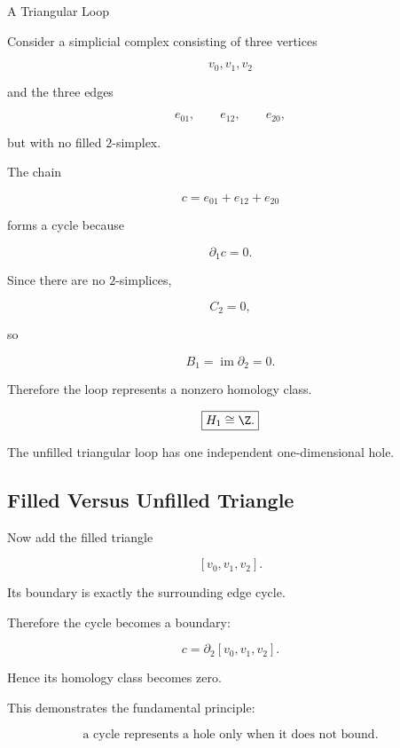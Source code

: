 \begin{workedexamplebox}{A Triangular Loop}

Consider a simplicial complex consisting of three vertices

\[
v_0,v_1,v_2
\]

and the three edges

\[
e_{01},
\qquad
e_{12},
\qquad
e_{20},
\]

but with no filled \(2\)-simplex.

The chain

\[
c=e_{01}+e_{12}+e_{20}
\]

forms a cycle because

\[
\partial_1 c=0.
\]

Since there are no \(2\)-simplices,

\[
C_2=0,
\]

so

\[
B_1=\operatorname{im}\partial_2=0.
\]

Therefore the loop represents a nonzero homology class.

\begin{answerbox}
\[
\boxed{
H_1\cong\Z.
}
\]

The unfilled triangular loop has one independent one-dimensional hole.
\end{answerbox}
\end{workedexamplebox}

\subsection{Filled Versus Unfilled Triangle}
\label{subsec:filled-unfilled-triangle}

Now add the filled triangle

\[
[v_0,v_1,v_2].
\]

Its boundary is exactly the surrounding edge cycle.

Therefore the cycle becomes a boundary:

\[
\boxed{
c=\partial_2[v_0,v_1,v_2].
}
\]

Hence its homology class becomes zero.

This demonstrates the fundamental principle:

\[
\boxed{
\text{a cycle represents a hole only when it does not bound}.
}
\]

